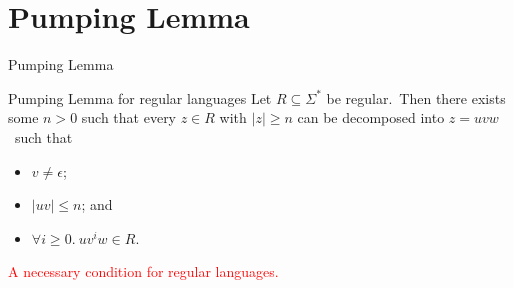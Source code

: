 \documentclass{beamer}
\def\r{\textcolor{red}}
\begin{document}
\section{Pumping Lemma}

\begin{frame}{Pumping Lemma}
    \begin{theorem}{Pumping Lemma for regular languages}
        Let $R \subseteq \Sigma^*$ be regular.\pause\ Then there exists some $n > 0$ such that every $z \in R$ with $|z| \geq n$ can be decomposed into $z = uvw$\pause\ such that
        \begin{itemize}
            \item $v \neq \epsilon$\pause;
            \item $|uv| \leq n$\pause; and
            \item $\forall i \geq 0.\ uv^iw \in R$.
        \end{itemize}
    \end{theorem}\pause
    \r{A necessary condition for regular languages.}
\end{frame}
\end{document}
